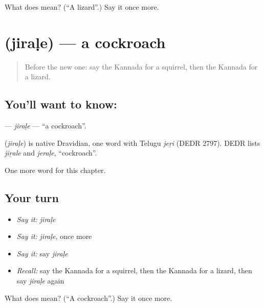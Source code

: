 \begin{tcolorbox}[breakable,colback=teal!4,colframe=teal!35!black,title={Before you move on}]
What does  mean? (\textquotedblleft{}A lizard\textquotedblright{}.) Say it once more.
\end{tcolorbox}
\section[\texorpdfstring{\kn{ಜಿರಳೆ} (jiraḷe)}{ಜಿರಳೆ (jiraḷe)}]{ (jiraḷe) — a cockroach}

\label{lesson:KA-C261-jirale}



\begin{quote}
Before the new one: say the Kannada for a squirrel, then the Kannada for a lizard.
\end{quote}

\subsection*{You'll want to know: }
\textbf{} — \emph{jiraḷe} — \textquotedblleft{}a cockroach\textquotedblright{}.

\begin{cousinweb}
\textbf{} (\emph{jiraḷe}) is native Dravidian, one word with Telugu \emph{jeṟi} (DEDR 2797). DEDR lists \emph{jiṟale} and \emph{jeraḷe}, \textquotedblleft{}cockroach\textquotedblright{}.
\end{cousinweb}

\begin{grammarlens}[title={What you've built}]
One more word for this chapter.
\end{grammarlens}

\subsection*{Your turn}
\begin{itemize}
\raggedright
  \item \emph{Say it:} \emph{jiraḷe}
  \item \emph{Say it:} \emph{jiraḷe}, once more
  \item \emph{Say it:} say \emph{jiraḷe}
  \item \emph{Recall:} say the Kannada for a squirrel, then the Kannada for a lizard, then say \emph{jiraḷe} again
\end{itemize}

\begin{tcolorbox}[breakable,colback=teal!4,colframe=teal!35!black,title={Before you move on}]
What does  mean? (\textquotedblleft{}A cockroach\textquotedblright{}.) Say it once more.
\end{tcolorbox}
